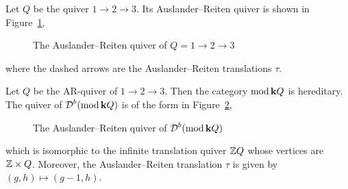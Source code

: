 \begin{example}
  Let $Q$ be the quiver $1 \to 2 \to 3$.
  Its Auslander--Reiten quiver is shown in Figure~\ref{fig:label1},
  \begin{figure}[htbp]
    \centering
    \caption{The Auslander--Reiten quiver of $Q = 1 \to 2 \to 3$}
    \label{fig:label1}
  \end{figure}
  where the dashed arrows are the Auslander--Reiten translations $\tau$.
\end{example}

\begin{example}
  Let $Q$ be the AR-quiver of $1 \to 2 \to 3$.
  Then the category $\operatorname{mod} \mathbf{k} Q$ is hereditary.
  The quiver of $\operatorname{\mathcal{D}}^b(\operatorname{mod} \mathbf{k} Q)$ is of the form in Figure~\ref{fig:label2},
  \begin{figure}[htbp]
    \centering
    \caption{The Auslander--Reiten quiver of $\operatorname{\mathcal{D}}^b(\operatorname{mod} \mathbf{k} Q)$}
    \label{fig:label2}
  \end{figure}
  which is isomorphic to the infinite translation quiver $\mathbb{Z} Q$
  whose vertices are $\mathbb{Z} \times Q$.
  Moreover, the Auslander--Reiten translation $\tau$
  is given by $(g, h) \mapsto (g - 1, h)$.
\end{example}


